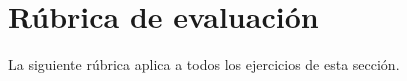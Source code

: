 \section{Rúbrica de evaluación}
La siguiente rúbrica aplica a todos los ejercicios de esta sección.

\rubricaIC